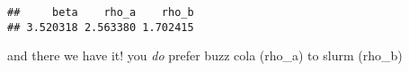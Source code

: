 \documentclass[]{article}
\newenvironment{Shaded}{\begin{snugshade}}{\end{snugshade}}
\newcommand{\CommentTok}[1]{\textcolor[rgb]{0.56,0.35,0.01}{\textit{#1}}}
\newcommand{\OperatorTok}[1]{\textcolor[rgb]{0.81,0.36,0.00}{\textbf{#1}}}
\newcommand{\NormalTok}[1]{#1}
\begin{document}
\begin{Shaded}
\end{Shaded}

\begin{verbatim}
##     beta    rho_a    rho_b 
## 3.520318 2.563380 1.702415
\end{verbatim}

and there we have it! you \emph{do} prefer buzz cola (rho\_a) to slurm
(rho\_b)
\end{document}
